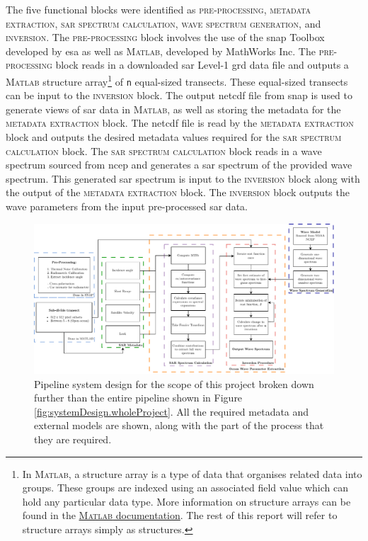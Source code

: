 The five functional blocks were identified as \textsc{pre-processing}, \textsc{metadata extraction}, \textsc{\acs{sar} spectrum calculation}, \textsc{wave spectrum generation}, and \textsc{inversion}. The \textsc{pre-processing} block involves the use of the \ac{snap} Toolbox developed by \ac{esa} as well as \textsc{Matlab}, developed by MathWorks Inc. The \textsc{pre-processing} block reads in a downloaded \acs{sar} Level-1 \ac{grd} data file and outputs a \textsc{Matlab} structure array\footnote{In \textsc{Matlab}, a structure array is a type of data that organises related data into groups. These groups are indexed using an associated field value which can hold any particular data type. More information on structure arrays can be found in the \href{https://www.mathworks.com/help/matlab/ref/struct.html}{\textsc{Matlab} documentation}. The rest of this report will refer to structure arrays simply as structures.} of \lstinline[columns=fixed]{n} equal-sized transects. These equal-sized transects can be input to the \textsc{inversion} block. The output \ac{netcdf} file from \acs{snap} is used to generate views of \acs{sar} data in \textsc{Matlab}, as well as storing the metadata for the \textsc{metadata extraction} block. The \ac{netcdf} file is read by the \textsc{metadata extraction} block and outputs the desired metadata values required for the \textsc{\acs{sar} spectrum calculation} block. The \textsc{\acs{sar} spectrum calculation} block reads in a wave spectrum sourced from \ac{ncep} and generates a \acs{sar} spectrum of the provided wave spectrum. This generated \acs{sar} spectrum is input to the \textsc{inversion} block along with the output of the \textsc{metadata extraction} block. The \textsc{inversion} block outputs the wave parameters from the input pre-processed \acs{sar} data.
\begin{figure}[H]
    \centering
    \includegraphics[width=.95\linewidth]{Figures/PipelineDesign/4022_pipeline.pdf}
    \caption{Pipeline system design for the scope of this project broken down further than the entire pipeline shown in Figure \ref{fig:systemDesign.wholeProject}. All the required metadata and external models are shown, along with the part of the process that they are required.}
    \label{fig:systemDesign.scope}
\end{figure}
